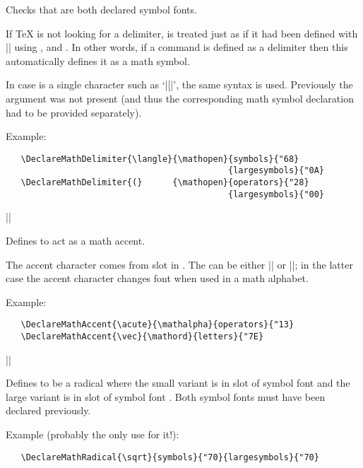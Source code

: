 \documentclass{ltxguide}[1995/11/28]
\begin{document}
Checks that  are both declared symbol fonts.
 
If \TeX{} is not looking for a delimiter,  is treated just as
if it had been defined with |\DeclareMathSymbol| using
,  and .  In other words, if a
command is defined as a delimiter then this automatically defines it
as a math symbol.

In case  is a single character such as `|[|', the same syntax is
used.  Previously the  argument was not present (and thus the
corresponding math symbol declaration had to be provided separately).
 
Example:
\begin{verbatim}
   \DeclareMathDelimiter{\langle}{\mathopen}{symbols}{"68}
                                            {largesymbols}{"0A}
   \DeclareMathDelimiter{(}      {\mathopen}{operators}{"28}
                                            {largesymbols}{"00}
\end{verbatim}
 
 
\begin{decl}
|\DeclareMathAccent|    
\end{decl}
 
Defines  to act as a math accent.
 
The accent character comes from slot  in
. The  can be either
|\mathord| or |\mathalpha|; in the latter case the accent character
changes font when used in a math alphabet.
 
Example:
\begin{verbatim}
   \DeclareMathAccent{\acute}{\mathalpha}{operators}{"13}
   \DeclareMathAccent{\vec}{\mathord}{letters}{"7E}
\end{verbatim}
 
 
\begin{decl}
|\DeclareMathRadical| 
                     \\
       \null\hfill  {} 
\end{decl}
 
Defines  to be a radical where the small variant is in
slot  of symbol font  and the
large variant is in slot  of symbol font
.  Both symbol fonts must have been declared
previously.
 
Example (probably the only use for it!):
\begin{verbatim}
   \DeclareMathRadical{\sqrt}{symbols}{"70}{largesymbols}{"70}
\end{verbatim}
 
\end{document}

